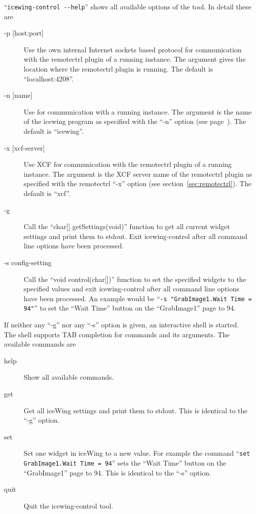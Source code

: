 ``\verb|icewing-control --help|'' shows all available options of the
tool. In detail these are
\begin{description}
\item[-p [host:port{]}] Use the own internal Internet sockets based
  protocol for communication with the remotectrl plugin of a running
  \icewing{} instance. The argument gives the location where the
  remotectrl plugin is running. The default is
  \mbox{``localhost:4208''}.
\item[-n [name{]}] Use \dacs{} for communication with a running
  \icewing{} instance. The argument is the \dacs{} name of the
  icewing program as specified with the \icewing{} ``-n'' option
  (see page~). The default is
  ``icewing''.
\item[-x [xcf-server{]}] Use XCF for communication with the remotectrl
  plugin of a running \icewing{} instance. The argument is the XCF
  server name of the remotectrl plugin as specified with the
  remotectrl ``-x'' option (see section~\ref{sec:remotectrl}). The
  default is ``xcf''.
\item[-g] Call the ``char[] getSettings(void)'' function to get all
  current widget settings and print them to stdout. Exit
  icewing-control after all command line options have been
  processed.
\item[-s config-setting] Call the ``void control(char[])'' function
  to set the specified widgets to the specified values and exit
  icewing-control after all command line options have been
  processed. An example would be
  ``\verb|-s "GrabImage1.Wait Time = 94"|'' to set the ``Wait Time''
  button on the ``GrabImage1'' page to 94.
\end{description}

If neither any ``-g'' nor any ``-s'' option is given, an interactive
shell is started. The shell supports TAB completion for commands and
its arguments. The available commands are
\begin{description}
\item[help] Show all available commands.
\item[get] Get all iceWing settings and print them to stdout. This
  is identical to the ``-g'' option.
\item[set] Set one widget in iceWing to a new value. For example the
  command ``\verb|set GrabImage1.Wait Time = 94|'' sets the
  ``Wait Time'' button on the ``GrabImage1'' page to 94. This is
  identical to the ``-s'' option.
\item[quit] Quit the icewing-control tool.
\end{description}

